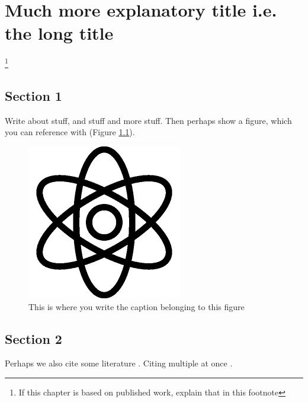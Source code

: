 

\chapter[Short title]{Much more explanatory title i.e. the long title} \label{chap:LABELTITLE2}
\footnote{If this chapter is based on published work, explain that in this footnote}

\begin{refsection}


\newpage	
\section{Section 1}

Write about stuff, and stuff and more stuff. Then perhaps show a figure, which you can reference with (Figure \ref{fig:LABELFORFIG2_1}).

\begin{figure}
\begin{center}
\includegraphics[width=0.7\columnwidth]{./C2_Topic1/figure_1/fig1.png}
\caption{\label{fig:LABELFORFIG2_1} This is where you write the caption belonging to this figure}
\end{center}
\end{figure}


\section{Section 2}

Perhaps we also cite some literature \cite{Marion1995}. Citing multiple at once \cite{Marion1995, rezakhaniha2012}.


\end{refsection}
